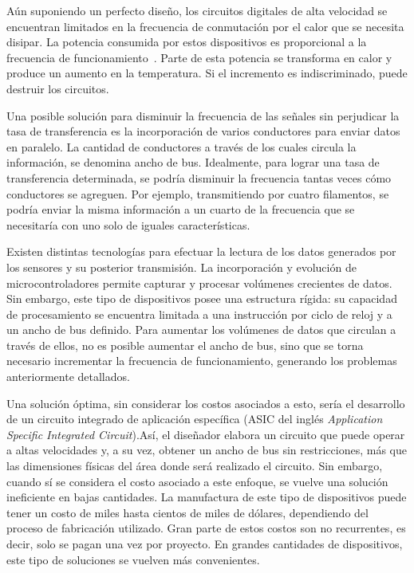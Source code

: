 Aún suponiendo un perfecto diseño, los circuitos digitales de alta velocidad se encuentran limitados en la frecuencia de conmutación por el calor que se necesita disipar. La potencia consumida por estos dispositivos es proporcional a la frecuencia de funcionamiento~\cite{Wakerly1999}. Parte de esta potencia se transforma en calor y produce un aumento en la temperatura. Si el incremento es indiscriminado, puede destruir los circuitos.%

Una posible solución para disminuir la frecuencia de las señales sin perjudicar la tasa de transferencia es la incorporación de varios conductores para enviar datos en paralelo.
La cantidad de conductores a través de los cuales circula la información, se denomina ancho de bus. Idealmente, para lograr una tasa de transferencia determinada, se podría disminuir la frecuencia tantas veces cómo conductores se agreguen. Por ejemplo, transmitiendo por cuatro filamentos, se podría enviar la misma información a un cuarto de la frecuencia que se necesitaría con uno solo de iguales características.%

Existen distintas tecnologías para efectuar la lectura de los datos generados por los sensores y su posterior transmisión. La incorporación y evolución de microcontroladores permite capturar y procesar volúmenes crecientes de datos. Sin embargo, este tipo de dispositivos posee una estructura rígida: su capacidad de procesamiento se encuentra limitada a una instrucción por ciclo de reloj y a un ancho de bus definido. Para aumentar los volúmenes de datos que circulan a través de ellos, no es posible aumentar el ancho de bus, sino que se torna necesario incrementar la frecuencia de funcionamiento, generando los problemas anteriormente detallados.%

Una solución óptima, sin considerar los costos asociados a esto, sería el desarrollo de un circuito integrado de aplicación específica (ASIC del inglés {\it Application Specific Integrated Circuit}).Así, el diseñador elabora un circuito que puede operar a altas velocidades y, a su vez, obtener un ancho de bus sin restricciones, más que las dimensiones físicas del área donde será realizado el circuito. Sin embargo, cuando sí se considera el costo asociado a este enfoque, se vuelve una solución ineficiente en bajas cantidades. La manufactura de este tipo de dispositivos puede tener un costo de miles hasta cientos de miles de dólares, dependiendo del proceso de fabricación utilizado. Gran parte de estos costos son no recurrentes, es decir, solo se pagan una vez por proyecto. En grandes cantidades de dispositivos, este tipo de soluciones se vuelven más convenientes.%

